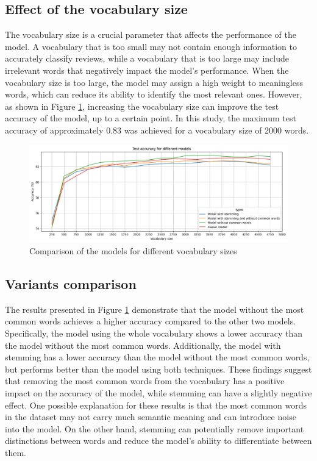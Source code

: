 \documentclass[eng]{class}
\begin{document}
\subsection{Effect of the vocabulary size}
The vocabulary size is a crucial parameter that affects the performance of the model.
A vocabulary that is too small may not contain enough information to accurately classify reviews,
while a vocabulary that is too large may include irrelevant words that negatively impact the model's performance.
When the vocabulary size is too large, the model may assign a high weight to meaningless words, which can reduce its ability to identify the most relevant ones.\newline
However, as shown in Figure \ref{fig-1}, increasing the vocabulary size can improve the test accuracy of the model, up to a certain point.
In this study, the maximum test accuracy of approximately 0.83 was achieved for a vocabulary size of 2000 words.
\begin{figure}[b]
  \centering
  \includegraphics[width=.7\columnwidth]{images/modelComp.png}
  \caption{Comparison of the models for different vocabulary sizes}
  \label{fig-1}
\end{figure}
\subsection{Variants comparison}
The results presented in Figure \ref{fig-1} demonstrate that the model without the most common words achieves a higher accuracy compared to the other two models.
Specifically, the model using the whole vocabulary shows a lower accuracy than the model without the most common words.
Additionally, the model with stemming has a lower accuracy than the model without the most common words, but performs better than the model using both techniques. \newline
These findings suggest that removing the most common words from the vocabulary has a positive impact on the accuracy of the model,
while stemming can have a slightly negative effect.
One possible explanation for these results is that the most common words in the dataset may not carry much semantic meaning and can introduce noise into the model.
On the other hand, stemming can potentially remove important distinctions between words and reduce the model's ability to differentiate between them.
\end{document}
